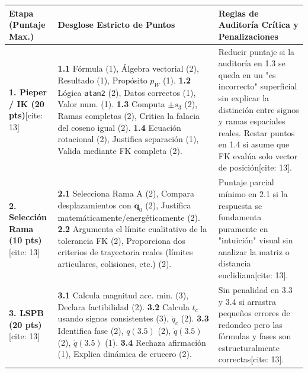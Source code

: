 \documentclass[11pt, a4paper, landscape]{article}
\begin{document}
\vspace{0.2cm}
{\small
\renewcommand{\arraystretch}{1.4}
\noindent
\begin{tabularx}{\textwidth}{|>{\hsize=0.6\hsize\raggedright\arraybackslash}X|>{\hsize=1.2\hsize\raggedright\arraybackslash}X|>{\hsize=1.2\hsize\raggedright\arraybackslash}X|}
\hline
\rowcolor{ucbblue!10} \textbf{Etapa (Puntaje Max.)} & \textbf{Desglose Estricto de Puntos} & \textbf{Reglas de Auditoría Crítica y Penalizaciones} \\ \hline

\textbf{1. Pieper / IK (20 pts)}[cite: 13] & 
\textbf{1.1} Fórmula (1), Álgebra vectorial (2), Resultado (1), Propósito $p_W$ (1). \newline
\textbf{1.2} Lógica \texttt{atan2} (2), Datos correctos (1), Valor num. (1). \newline
\textbf{1.3} Computa $\pm s_3$ (2), Ramas completas (2), Critica la falacia del coseno igual (2). \newline
\textbf{1.4} Ecuación rotacional (2), Justifica separación (1), Valida mediante FK completa (2). & 
Reducir puntaje si la auditoría en 1.3 se queda en un "es incorrecto" superficial sin explicar la distinción entre signos y ramas espaciales reales. Restar puntos en 1.4 si asume que FK evalúa solo vector de posición[cite: 13]. \\ \hline

\textbf{2. Selección Rama (10 pts)}[cite: 13] & 
\textbf{2.1} Selecciona Rama A (2), Compara desplazamientos con $\mathbf{q}_0$ (2), Justifica matemáticamente/energéticamente (2). \newline
\textbf{2.2} Argumenta el límite cualitativo de la tolerancia FK (2), Proporciona dos criterios de trayectoria reales (límites articulares, colisiones, etc.) (2). & 
Puntaje parcial mínimo en 2.1 si la respuesta se fundamenta puramente en "intuición" visual sin analizar la matriz o distancia euclidiana[cite: 13]. \\ \hline

\textbf{3. LSPB (20 pts)}[cite: 13] & 
\textbf{3.1} Calcula magnitud acc. min. (3), Declara factibilidad (2). \newline
\textbf{3.2} Calcula $t_c$ usando signos consistentes (3), $\dot{q}_c$ (2). \newline
\textbf{3.3} Identifica fase (2), $q(3.5)$ (2), $\dot{q}(3.5)$ (2), $\ddot{q}(3.5)$ (1). \newline
\textbf{3.4} Rechaza afirmación (1), Explica dinámica de crucero (2). & 
Sin penalidad en 3.3 y 3.4 si arrastra pequeños errores de redondeo pero las fórmulas y fases son estructuralmente correctas[cite: 13]. \\ \hline


\end{tabularx}}
\end{document}

